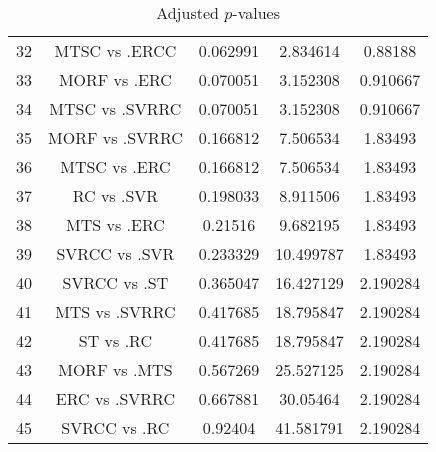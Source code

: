 \documentclass[a4paper,10pt]{article}
\begin{document}
\begin{landscape}
\begin{table}[!htp]
\begin{tabular}{ccccc}
32&MTSC vs .ERCC&0.062991&2.834614&0.88188\\
33&MORF vs .ERC&0.070051&3.152308&0.910667\\
34&MTSC vs .SVRRC&0.070051&3.152308&0.910667\\
35&MORF vs .SVRRC&0.166812&7.506534&1.83493\\
36&MTSC vs .ERC&0.166812&7.506534&1.83493\\
37&RC vs .SVR&0.198033&8.911506&1.83493\\
38&MTS vs .ERC&0.21516&9.682195&1.83493\\
39&SVRCC vs .SVR&0.233329&10.499787&1.83493\\
40&SVRCC vs .ST&0.365047&16.427129&2.190284\\
41&MTS vs .SVRRC&0.417685&18.795847&2.190284\\
42&ST vs .RC&0.417685&18.795847&2.190284\\
43&MORF vs .MTS&0.567269&25.527125&2.190284\\
44&ERC vs .SVRRC&0.667881&30.05464&2.190284\\
45&SVRCC vs .RC&0.92404&41.581791&2.190284\\
\hline
\end{tabular}
\caption{Adjusted $p$-values}
\end{table}

\end{landscape}
\end{document}
